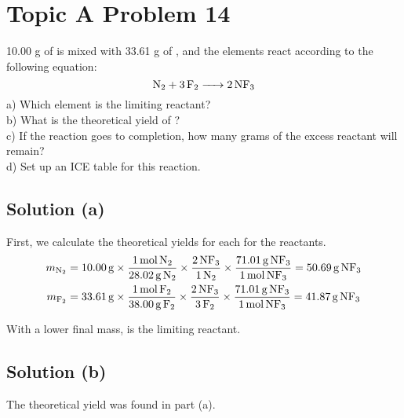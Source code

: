 \documentclass[10pt]{article}
\begin{document}
    \pagebreak
    \section{Topic A Problem 14}
        10.00 g of  is mixed with 33.61 g of , and the elements react according to the following equation: 
        \begin{equation}
            \ce{N2 + 3F2 -> 2NF3}
        \end{equation}
        a) Which element is the limiting reactant?\\
        b) What is the theoretical yield of ?\\
        c) If the reaction goes to completion, how many grams of the excess reactant will remain?\\
        d) Set up an ICE table for this reaction.

        \subsection{Solution (a)}
            First, we calculate the theoretical yields for each for the reactants.
            \begin{align}
                m_{\ce{N2}} &=  10.00\,\unit{\gram} \times \frac{1\,\unit{\mole}\,\ce{N2}}{28.02\,\unit{\gram}\,\ce{N2}} 
                                                    \times \frac{2\,\ce{NF3}}{1\,\ce{N2}}
                                                    \times \frac{71.01\,\unit{\gram}\,\ce{NF3}}{1\,\unit{\mole}\,\ce{NF3}}
                    =   50.69\,\unit{\gram}\,\ce{NF3}
                \\
                m_{\ce{F2}} &=  33.61\,\unit{\gram} \times \frac{1\,\unit{\mole}\,\ce{F2}}{38.00\,\unit{\gram}\,\ce{F2}} 
                                                    \times \frac{2\,\ce{NF3}}{3\,\ce{F2}}
                                                    \times \frac{71.01\,\unit{\gram}\,\ce{NF3}}{1\,\unit{\mole}\,\ce{NF3}}
                    =   41.87\,\unit{\gram}\,\ce{NF3}
            \end{align}

            With a lower final mass,  is the limiting reactant.

        \subsection{Solution (b)}
            The theoretical yield was found in part (a).
        
\end{document}
